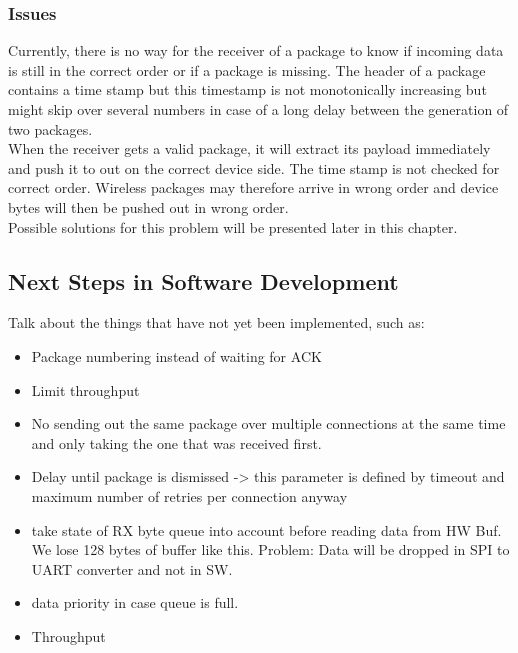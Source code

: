 \subsubsection{Issues}
Currently, there is no way for the receiver of a package to know if incoming data is still in the correct order or if a package is missing. The header of a package contains a time stamp but this timestamp is not monotonically increasing but might skip over several numbers in case of a long delay between the generation of two packages.\\
When the receiver gets a valid package, it will extract its payload immediately and push it to out on the correct device side. The time stamp is not checked for correct order. Wireless packages may therefore arrive in wrong order and device bytes will then be pushed out in wrong order.\\
Possible solutions for this problem will be presented later in this chapter.\\
%
%
\subsection{Next Steps in Software Development}%
%
Talk about the things that have not yet been implemented, such as:
\begin{itemize}
    \item Package numbering instead of waiting for ACK
    \item Limit throughput
    \item No sending out the same package over multiple connections at the same time and only taking the one that was received first.
    \item Delay until package is dismissed -> this parameter is defined by timeout and maximum number of retries per connection anyway
    \item take state of RX byte queue into account before reading data from HW Buf. We lose 128 bytes of buffer like this. Problem: Data will be dropped in SPI to UART converter and not in SW.
    \item data priority in case queue is full.
    \item Throughput
\end{itemize}